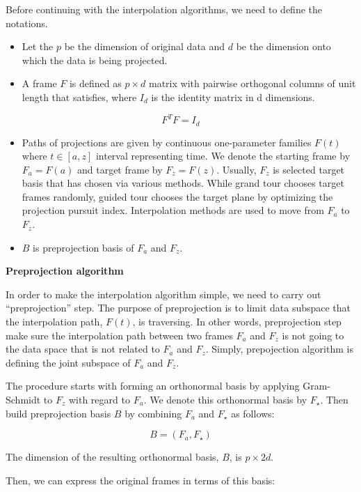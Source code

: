 Before continuing with the interpolation algorithms, we need to define the notations.

\begin{itemize}
\item
  Let the \(p\) be the dimension of original data and \(d\) be the dimension onto which the data is being projected.
\item
  A frame \(F\) is defined as \(p\times d\) matrix with pairwise orthogonal columns of unit length that satisfies, where \(I_d\) is the identity matrix in d dimensions.
\end{itemize}

\[F^TF = I_d\]

\begin{itemize}
\item
  Paths of projections are given by continuous one-parameter families \(F(t)\) where \(t\in [a, z]\) interval representing time. We denote the starting frame by \(F_a = F(a)\) and target frame by \(F_z = F(z)\). Usually, \(F_z\) is selected target basis that has chosen via various methods. While grand tour chooses target frames randomly, guided tour chooses the target plane by optimizing the projection pursuit index. Interpolation methods are used to move from \(F_a\) to \(F_z\).
\item
  \(B\) is preprojection basis of \(F_a\) and \(F_z\).
\end{itemize}

\textbf{Preprojection algorithm}

In order to make the interpolation algorithm simple, we need to carry out ``preprojection'' step.
The purpose of preprojection is to limit data subspace that the interpolation path, \(F(t)\), is traversing. In other words, preprojection step make sure the interpolation path between two frames \(F_a\) and \(F_z\) is not going to the data space that is not related to \(F_a\) and \(F_z\). Simply, prepojection algorithm is defining the joint subspace of \(F_a\) and \(F_z\).

The procedure starts with forming an orthonormal basis by applying Gram-Schmidt to \(F_z\) with regard to \(F_a\). We denote this orthonormal basis by \(F_\star\). Then build preprojection basis \(B\) by combining \(F_a\) and \(F_\star\) as follows:

\[B = (F_a, F_{\star})\]

The dimension of the resulting orthonormal basis, \(B\), is \(p\times 2d\).

Then, we can express the original frames in terms of this basis:

